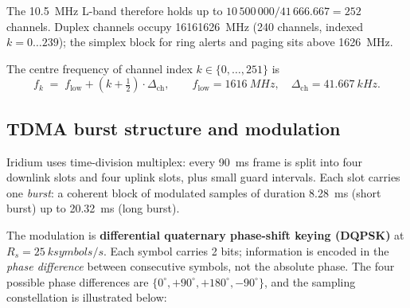 \documentclass[11pt,a4paper]{article}
\begin{document}
The \SI{10.5}{MHz} L-band therefore holds up to
$10\,500\,000 / 41\,666.667 = 252$ channels. Duplex channels
occupy \SI{1616}{}\textendash\SI{1626}{MHz} (240 channels, indexed
$k = 0 \ldots 239$); the simplex block for ring alerts and paging
sits above \SI{1626}{MHz}.

\begin{center}
\end{center}

The centre frequency of channel index $k \in \{0, \ldots, 251\}$ is
\begin{equation}
f_k \;=\; f_{\text{low}} + \left(k + \tfrac{1}{2}\right)\cdot \Delta_{\text{ch}},
\qquad
f_{\text{low}} = \SI{1616}{MHz}, \quad
\Delta_{\text{ch}} = \SI{41.667}{kHz}.
\end{equation}

\subsection{TDMA burst structure and modulation}

Iridium uses time-division multiplex: every \SI{90}{ms} frame is split into
four downlink slots and four uplink slots, plus small guard intervals. Each
slot carries one \emph{burst}: a coherent block of modulated samples of
duration \SI{8.28}{ms} (short burst) up to \SI{20.32}{ms} (long burst).

The modulation is \textbf{differential quaternary phase-shift keying
(DQPSK)} at $R_s = \SI{25}{ksymbols/s}$. Each symbol carries 2 bits;
information is encoded in the \emph{phase difference} between consecutive
symbols, not the absolute phase. The four possible phase differences are
$\{0^\circ, +90^\circ, +180^\circ, -90^\circ\}$, and the sampling
constellation is illustrated below:
\end{document}
